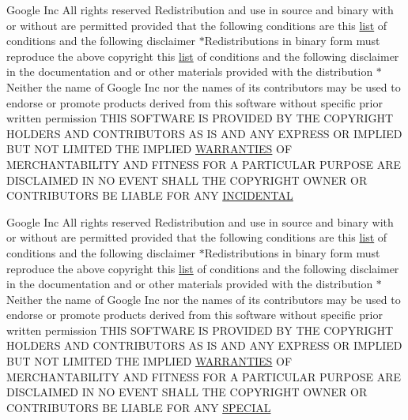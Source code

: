 \begin{DoxyCompactItemize}
\item 
Google Inc All rights reserved Redistribution and use in source and binary with or without are permitted provided that the following conditions are this \hyperlink{CMakeLists_8txt_a548e427ae9357a6f3536cff3ca23efda}{list} of conditions and the following disclaimer $\ast$Redistributions in binary form must reproduce the above copyright this \hyperlink{CMakeLists_8txt_a548e427ae9357a6f3536cff3ca23efda}{list} of conditions and the following disclaimer in the documentation and or other materials provided with the distribution $\ast$Neither the name of Google Inc nor the names of its contributors may be used to endorse or promote products derived from this software without specific prior written permission T\+H\+IS S\+O\+F\+T\+W\+A\+RE IS P\+R\+O\+V\+I\+D\+ED BY T\+HE C\+O\+P\+Y\+R\+I\+G\+HT H\+O\+L\+D\+E\+RS A\+ND C\+O\+N\+T\+R\+I\+B\+U\+T\+O\+RS AS IS A\+ND A\+NY E\+X\+P\+R\+E\+SS OR I\+M\+P\+L\+I\+ED B\+UT N\+OT L\+I\+M\+I\+T\+ED T\+HE I\+M\+P\+L\+I\+ED \hyperlink{COPYING_8txt_ac62ff2f8b2f565a26b35ecca12f17f4a}{W\+A\+R\+R\+A\+N\+T\+I\+ES} OF M\+E\+R\+C\+H\+A\+N\+T\+A\+B\+I\+L\+I\+TY A\+ND F\+I\+T\+N\+E\+SS F\+OR A P\+A\+R\+T\+I\+C\+U\+L\+AR P\+U\+R\+P\+O\+SE A\+RE D\+I\+S\+C\+L\+A\+I\+M\+ED IN NO E\+V\+E\+NT S\+H\+A\+LL T\+HE C\+O\+P\+Y\+R\+I\+G\+HT O\+W\+N\+ER OR C\+O\+N\+T\+R\+I\+B\+U\+T\+O\+RS BE L\+I\+A\+B\+LE F\+OR A\+NY \hyperlink{COPYING_8txt_a89d50cb807b3f834d9fd0c8f3e983659}{I\+N\+C\+I\+D\+E\+N\+T\+AL}
\item 
Google Inc All rights reserved Redistribution and use in source and binary with or without are permitted provided that the following conditions are this \hyperlink{CMakeLists_8txt_a548e427ae9357a6f3536cff3ca23efda}{list} of conditions and the following disclaimer $\ast$Redistributions in binary form must reproduce the above copyright this \hyperlink{CMakeLists_8txt_a548e427ae9357a6f3536cff3ca23efda}{list} of conditions and the following disclaimer in the documentation and or other materials provided with the distribution $\ast$Neither the name of Google Inc nor the names of its contributors may be used to endorse or promote products derived from this software without specific prior written permission T\+H\+IS S\+O\+F\+T\+W\+A\+RE IS P\+R\+O\+V\+I\+D\+ED BY T\+HE C\+O\+P\+Y\+R\+I\+G\+HT H\+O\+L\+D\+E\+RS A\+ND C\+O\+N\+T\+R\+I\+B\+U\+T\+O\+RS AS IS A\+ND A\+NY E\+X\+P\+R\+E\+SS OR I\+M\+P\+L\+I\+ED B\+UT N\+OT L\+I\+M\+I\+T\+ED T\+HE I\+M\+P\+L\+I\+ED \hyperlink{COPYING_8txt_ac62ff2f8b2f565a26b35ecca12f17f4a}{W\+A\+R\+R\+A\+N\+T\+I\+ES} OF M\+E\+R\+C\+H\+A\+N\+T\+A\+B\+I\+L\+I\+TY A\+ND F\+I\+T\+N\+E\+SS F\+OR A P\+A\+R\+T\+I\+C\+U\+L\+AR P\+U\+R\+P\+O\+SE A\+RE D\+I\+S\+C\+L\+A\+I\+M\+ED IN NO E\+V\+E\+NT S\+H\+A\+LL T\+HE C\+O\+P\+Y\+R\+I\+G\+HT O\+W\+N\+ER OR C\+O\+N\+T\+R\+I\+B\+U\+T\+O\+RS BE L\+I\+A\+B\+LE F\+OR A\+NY \hyperlink{COPYING_8txt_a6680f56c922f2de277fe520d9c651d4e}{S\+P\+E\+C\+I\+AL}

\end{DoxyCompactItemize}
